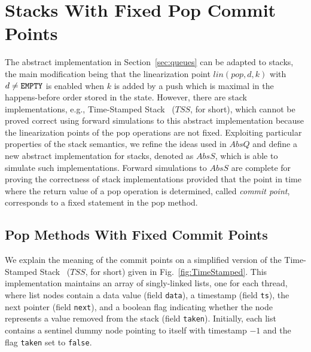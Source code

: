 \vspace{-3.5mm}
\section{Stacks With Fixed Pop Commit Points}\label{sec:stacks}
\vspace{-1.5mm}
The abstract implementation in Section~\ref{sec:queues} can be adapted to stacks, the main modification being that the linearization point $lin(pop,d,k)$ with $d\neq{\tt EMPTY}$ is enabled when $k$ is added by a push which is maximal in the happens-before order stored in the state. However, there are stack implementations, e.g., Time-Stamped Stack~\cite{DBLP:conf/popl/DoddsHK15} ($\mathit{TSS}$, for short), which cannot be proved correct using forward simulations to this abstract implementation because the linearization points of the pop operations are not fixed.
Exploiting particular properties of the stack semantics, we refine the ideas used in $AbsQ$ and define
a new abstract implementation for stacks, denoted as $AbsS$, which is able to simulate such implementations. Forward simulations to $AbsS$ are complete for proving the correctness of stack implementations provided that the point in time where the return value of a pop operation is determined, called \emph{commit point}, corresponds to a fixed statement in the pop method.

\vspace{-3.5mm}
\subsection{Pop Methods With Fixed Commit Points}
\vspace{-1mm}

We explain the meaning of the commit points on a simplified version of the Time-Stamped Stack~\cite{DBLP:conf/popl/DoddsHK15} ($\mathit{TSS}$, for short) given in Fig.~\ref{fig:TimeStamped}. This  implementation maintains an array of singly-linked lists, one for each thread, where list nodes contain a data value (field {\tt data}), a timestamp (field {\tt ts}), the next pointer (field {\tt next}), and a boolean flag indicating whether the node represents a value removed from the stack (field {\tt taken}). Initially, each list contains a sentinel dummy node pointing to itself with timestamp $-1$ and the flag {\tt taken} set to {\tt false}.


